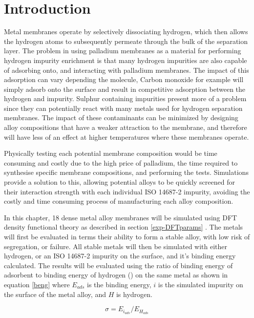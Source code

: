 \section{Introduction}
Metal membranes operate by selectively dissociating hydrogen, which then allows the hydrogen atoms to subsequently permeate through the bulk of the separation layer. The problem in using palladium membranes as a material for performing hydrogen impurity enrichment is that many hydrogen impurities are also capable of adsorbing onto, and interacting with palladium membranes. The impact of this adsorption can vary depending the molecule, Carbon monoxide for example will simply adsorb onto the surface and result in competitive adsorption between the hydrogen and impurity. Sulphur containing impurities present more of a problem since they can potentially react with many metals used for hydrogen separation membranes. The impact of these contaminants can be minimized by designing alloy compositions that have a weaker attraction to the membrane, and therefore will have less of an effect at higher temperatures where these membranes operate.

Physically testing each potential membrane composition would be time consuming and costly due to the high price of palladium, the time required to synthesise specific membrane compositions, and performing the tests. Simulations provide a solution to this, allowing potential alloys to be quickly screened for their interaction strength with each individual ISO 14687-2 impurity, avoiding the costly and time consuming process of manufacturing each alloy composition. 

In this chapter, 18 dense metal alloy membranes will be simulated using DFT density functional theory as described in section \ref{exp-DFTparams} \cite{QE-2009, QE-2017, doi:10.1063/5.0005082}. The metals will first be evaluated in terms their ability to form a stable alloy, with low risk of segregation, or failure. All stable metals will then be simulated with either hydrogen, or an ISO 14687-2 impurity on the surface, and it's binding energy calculated. The results will be evaluated using the ratio of binding energy of adsorbent to binding energy of hydrogen (\textsigma) on the same metal as shown in equation \ref{beng} where $E_{ads}$ is the binding energy, $i$ is the simulated impurity on the surface of the metal alloy, and $H$ is hydrogen. 

\begin{equation}\label{beng}
  \sigma=E_{i_{ads}}/E_{H_{ads}}
\end{equation}

